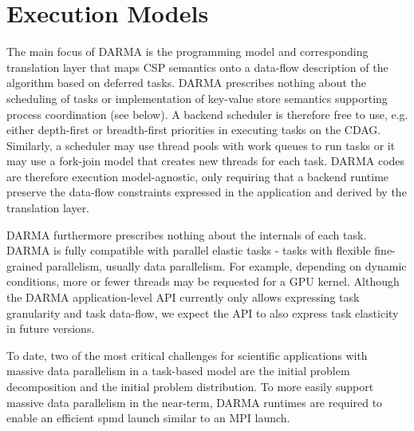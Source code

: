
\section{Execution Models}
\label{sec:exec_model}

The main focus of DARMA is the programming model and corresponding translation layer that maps CSP semantics onto a data-flow description of the algorithm based on deferred tasks.
DARMA prescribes nothing about the scheduling of tasks or implementation of key-value store semantics supporting process coordination (see below).
A backend scheduler is therefore free to use, e.g. either depth-first or breadth-first priorities in executing tasks on the CDAG.
Similarly, a scheduler may use thread pools with work queues to run tasks or it may use a fork-join model that creates new threads for each task.
DARMA codes are therefore execution model-agnostic, only requiring that a backend runtime preserve the data-flow constraints expressed in the application and derived by the translation layer.

DARMA furthermore prescribes nothing about the internals of each task.
DARMA is fully compatible with parallel elastic tasks - tasks with flexible fine-grained parallelism, usually data parallelism.
For example, depending on dynamic conditions, more or fewer threads may be requested for a GPU kernel.
Although the DARMA application-level API currently only allows expressing task granularity and task data-flow,
we expect the API to also express task elasticity in future versions.

To date, two of the most critical challenges for scientific applications with massive data parallelism in a task-based model
are the initial problem decomposition and the initial problem distribution.
To more easily support massive data parallelism in the near-term,
DARMA runtimes are required to enable an efficient \gls{spmd} launch similar to an MPI launch.
